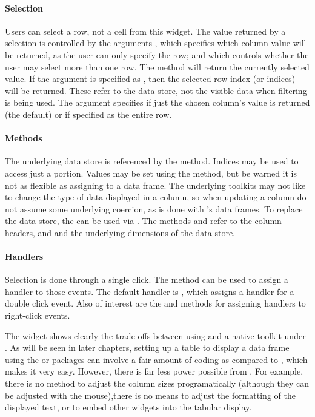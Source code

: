 \paragraph{Selection}
Users can select a row, not a cell from this widget. The value returned by a selection is
controlled by the arguments , which
specifies which column value will be returned, as the user can only
specify the row; and  which controls
whether the user may select more than one row.  The
 method will return the currently selected
value. If the argument  is specified as , then
the selected row index (or indices) will be returned. These refer to
the data store, not the visible data when filtering is being used. The
argument  specifies if just the chosen column's value is
returned (the default) or if specified as  the entire row.

\paragraph{Methods}
The underlying data store is referenced by the \method{[}{gtable}
method. Indices may be used to access just a portion. Values may be
set using the \method{[\ASSIGN}{gtable} method, but be warned it is
not as flexible as assigning to a data frame. The underlying
toolkits may not like to change the type of data displayed in a
column, so when updating a column do not assume some underlying
coercion, as is done with \R's data frames. To replace the data store, the \code{[\ASSIGN} can
be used via . The methods
 and  refer to the
column headers, and  and 
the underlying dimensions of the data store.

\paragraph{Handlers}
Selection is done through a single click. The 
method can be used to assign a handler to those events. The default
handler is , which assigns a
handler for a double click event. Also of interest are the
 and
 methods for assigning handlers
to  right-click events.

The  widget shows clearly the trade offs between
using  and a native toolkit under \R. As will be seen in later chapters,
setting up a table to display a data frame using the  or  packages can involve a fair amount
of coding as compared to
, which makes it very easy. However, there is far
less power possible from . For example, there is no
method to adjust the column sizes programatically (although they can
be adjusted with the mouse),there is no means to adjust the formatting of
the displayed text, or to embed other widgets into the tabular display.

